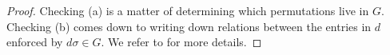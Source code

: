 \begin{proof}
    Checking (a) is a matter of determining which permutations live in $G$. Checking (b) comes down to writing down relations between the entries in $d$ enforced by $d\sigma\in G$. We refer to \cite[Exercise~7.16]{kirillov-lie-algebra} for more details.
\end{proof}
